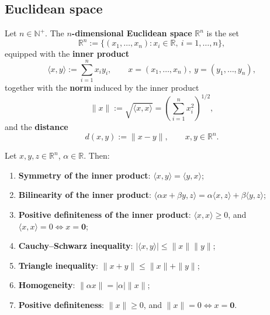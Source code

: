 \subsection{Euclidean space}

\begin{definition}\label{def:euclidean_space}
Let $n \in \mathbb{N}^+$. The \textbf{$n$-dimensional Euclidean space} $\mathbb{R}^n$ is the set
\[
\mathbb{R}^n := \{(x_1, \dots, x_n) : x_i \in \mathbb{R},\ i = 1, \dots, n\},
\]
equipped with the \textbf{inner product}
\[
\langle x, y \rangle := \sum_{i=1}^{n} x_i y_i, \qquad x = (x_1, \dots, x_n),\ y = (y_1, \dots, y_n),
\]
together with the \textbf{norm} induced by the inner product
\[
\|x\| := \sqrt{\langle x, x \rangle} = \left( \sum_{i=1}^{n} x_i^2 \right)^{1/2},
\]
and the \textbf{distance}
\[
d(x, y) := \|x - y\|, \qquad x, y \in \mathbb{R}^n.
\]
\end{definition}

\begin{proposition}\label{prop:inner_norm_properties}
Let $x, y, z \in \mathbb{R}^n$, $\alpha \in \mathbb{R}$. Then:
\begin{enumerate}[label=(\roman*)]
    \item \textbf{Symmetry of the inner product}: $\langle x, y \rangle = \langle y, x \rangle$;
    \item \textbf{Bilinearity of the inner product}: $\langle \alpha x + \beta y, z \rangle = \alpha \langle x, z \rangle + \beta \langle y, z \rangle$;
    \item \textbf{Positive definiteness of the inner product}: $\langle x, x \rangle \ge 0$, and $\langle x, x \rangle = 0 \iff x = \mathbf{0}$;
    \item \textbf{Cauchy--Schwarz inequality}: $|\langle x, y \rangle| \le \|x\| \|y\|$;
    \item \textbf{Triangle inequality}: $\|x + y\| \le \|x\| + \|y\|$;
    \item \textbf{Homogeneity}: $\|\alpha x\| = |\alpha| \|x\|$;
    \item \textbf{Positive definiteness}: $\|x\| \ge 0$, and $\|x\| = 0 \iff x = \mathbf{0}$.
\end{enumerate}
\end{proposition}

